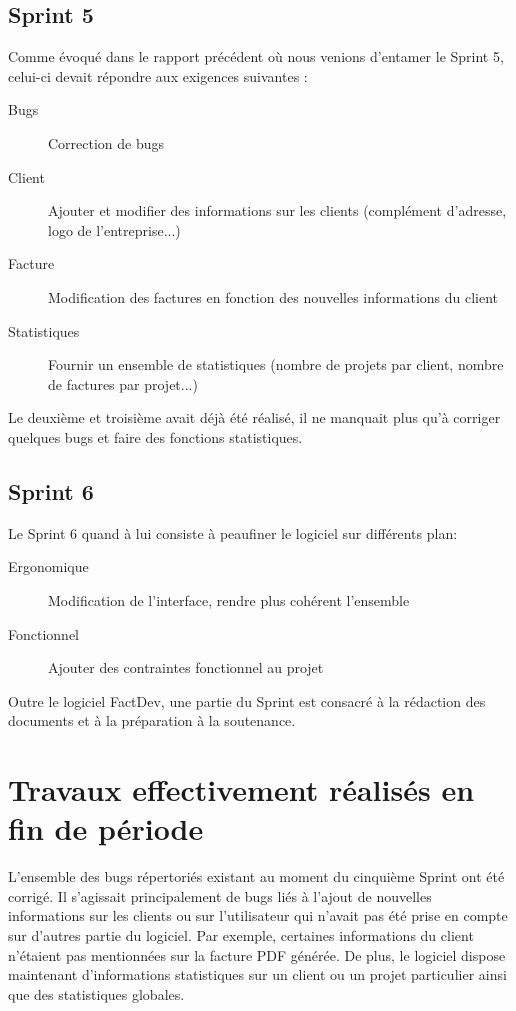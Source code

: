 \documentclass[12pt,a4paper,openany]{article}
\begin{document}
	\subsection{Sprint 5}
	Comme évoqué dans le rapport précédent où nous venions d'entamer le Sprint 5, celui-ci devait répondre aux exigences suivantes :
	\begin{description}
		\item [Bugs] Correction de bugs
		\item [Client] Ajouter et modifier des informations sur les clients (complément d'adresse, logo de l'entreprise...)
		\item [Facture] Modification des factures en fonction des nouvelles informations du client
		\item [Statistiques] Fournir un ensemble de statistiques (nombre de projets par client, nombre de factures par projet...)
	\end{description}
	Le deuxième et troisième avait déjà été réalisé, il ne manquait plus qu'à corriger quelques bugs et faire des fonctions statistiques. 
	
	\subsection{Sprint 6}
	Le Sprint 6 quand à lui consiste à peaufiner le logiciel sur différents plan: 
	\begin{description}
		\item [Ergonomique] Modification de l'interface, rendre plus cohérent l'ensemble
		\item [Fonctionnel] Ajouter des contraintes fonctionnel au projet
	\end{description}
	Outre le logiciel FactDev, une partie du Sprint est consacré à la rédaction des documents et à la préparation à la soutenance. 
	\section{Travaux effectivement réalisés en fin de période}\label{work}
	L'ensemble des bugs répertoriés existant au moment du cinquième Sprint ont été corrigé. Il s’agissait principalement de bugs liés à l'ajout de nouvelles informations sur les clients ou sur l'utilisateur qui n'avait pas été prise en compte sur d'autres partie du logiciel. Par exemple, certaines informations du client n'étaient pas mentionnées sur la facture PDF générée. De plus, le logiciel dispose maintenant d'informations statistiques sur un client ou un projet particulier ainsi que des statistiques globales.  
\end{document}
